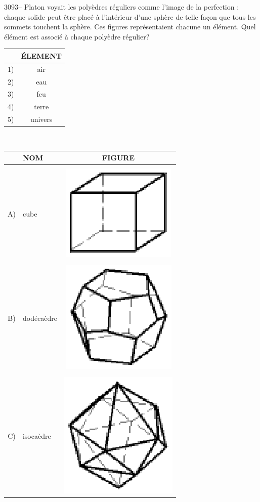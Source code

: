 \documentclass[letterpaper, 12pt]{article}
\begin{document}
3093-- Platon voyait les poly\`edres r\'eguliers comme l'image de la perfection : chaque solide peut \^etre plac\'e \`a l'int\'erieur d'une sph\`ere de telle fa\c con que tous les sommets touchent la sph\`ere. Ces figures repr\'esentaient chacune un \'el\'ement. Quel \'el\'ement est associ\'e \`a chaque poly\`edre r\'egulier?\\
\begin{center}
\begin{tabular}{|c|c|} \cline{2-2}
\multicolumn{1}{c|}{} & {\bf \'ELEMENT}\\ \hline \hline
1) & air\\ \hline
2) & eau\\ \hline
3) & feu\\ \hline
4) & terre\\ \hline
5) & univers\\ \hline
\end{tabular} \ \ \ \ \ \ \ \
\begin{tabular}{|c|l|c|} \cline{2-3}
\multicolumn{1}{c|}{} & {\bf NOM} & {FIGURE}\\ \hline \hline
 & & \\
A) & cube & \includegraphics[scale=0.25]{polycube.eps}\\ \hline
 & & \\
B) & dod\'eca\`edre & \includegraphics[scale=0.25]{polydode.eps}\\ \hline
 & & \\
C) & isoca\`edre & \includegraphics[scale=0.25]{polyiso.eps}\\ \hline

\end{tabular}
\end{center}
\end{document}
